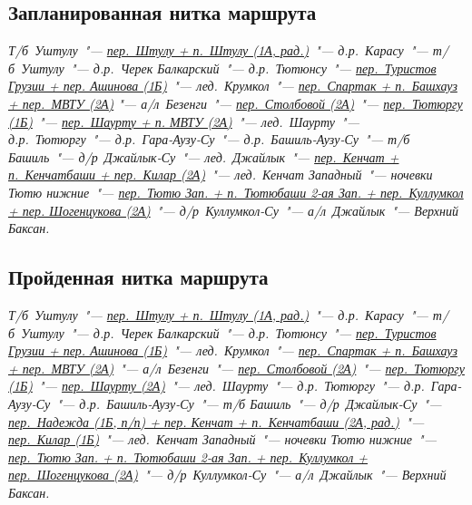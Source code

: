 	\subsection{Запланированная нитка маршрута}\label{subsec:planned_route}
\renewcommand{\bfdefault}{bx}
		\textit{%
			Т/б~Уштулу~"---
			\hyperref[subsec:Day2]{пер.~Штулу + п.~Штулу (1А, рад.)}~"---
			д.р.~Карасу~"---
			т/б~Уштулу~"---
			д.р.~Черек Балкарский~"---
			д.р.~Тютюнсу~"---
			\hyperref[subsec:Day4]{пер.~Туристов Грузии + пер. Ашинова (1Б)}~"---
			лед.~Крумкол~"---
			\hyperref[subsec:Day6]{пер.~Спартак + п.~Башхауз + пер.~МВТУ (2А)} "---
			а/л~Безенги~"---
			\hyperref[subsec:Day11]{пер.~Столбовой (2А)}~"---
			\hyperref[subsec:Day12]{пер.~Тютюргу (1Б)}~"---
			\hyperref[subsec:Day12]{пер.~Шаурту + п. МВТУ (2А)}~"---
			лед.~Шаурту~"---
			д.р.~Тютюргу~"---
			д.р.~Гара-Аузу-Су~"---
			д.р.~Башиль-Аузу-Су~"---
			т/б Башиль~"---
			д/р~Джайлык-Су~"---
			лед.~Джайлык~"---
			\hyperref[subsec:Day16]{пер.~Кенчат + п.~Кенчатбаши + пер.~Килар (2А)}~"---
			лед.~Кенчат Западный~"---
			ночевки Тютю нижние~"---
			\hyperref[subsec:Day17]{пер.~Тютю Зап. + п.~Тютюбаши 2-ая Зап. + пер.~Куллумкол + пер. Шогенцукова (2А)}~"---
			д/р~Куллумкол-Су~"---
			а/л~Джайлык~"---
			Верхний Баксан.%
		}
	
	\subsection{Пройденная нитка маршрута}\label{subsec:real_route}
		\textit{%
			Т/б~Уштулу~"---
			\hyperref[subsec:Day2]{пер.~Штулу + п.~Штулу (1А, рад.)}~"---
			д.р.~Карасу~"---
			т/б~Уштулу~"---
			д.р.~Черек Балкарский~"---
			д.р.~Тютюнсу~"---
			\hyperref[subsec:Day4]{пер.~Туристов Грузии + пер. Ашинова (1Б)}~"---
			лед.~Крумкол~"---
			\hyperref[subsec:Day6]{пер.~Спартак + п.~Башхауз + пер.~МВТУ (2А)}~"---
			а/л~Безенги~"---
			\hyperref[subsec:Day11]{пер.~Столбовой (2А)}~"---
			\hyperref[subsec:Day12]{пер.~Тютюргу (1Б)}~"---
			\hyperref[subsec:Day12]{пер.~Шаурту (2А)}~"---
			лед.~Шаурту~"---
			д.р.~Тютюргу~"---
			д.р.~Гара-Аузу-Су~"---
			д.р.~Башиль-Аузу-Су~"---
			т/б Башиль~"---
			д/р~Джайлык-Су~"---
			\hyperref[subsec:Day16]{пер.~Надежда (1Б, п/п) + пер. Кенчат + п.~Кенчатбаши (2А, рад.)}~"---
			\hyperref[subsec:Day16]{пер.~Килар (1Б)}~"---
			лед.~Кенчат Западный~"---
			ночевки Тютю нижние~"---
			\hyperref[subsec:Day17]{пер.~Тютю Зап. + п.~Тютюбаши 2-ая Зап. + пер.~Куллумкол + пер.~Шогенцукова (2А)}~"---
			д/р~Куллумкол-Су~"---
			а/л~Джайлык~"---
			Верхний Баксан.%
		}
		\renewcommand{\bfdefault}{b}
		
